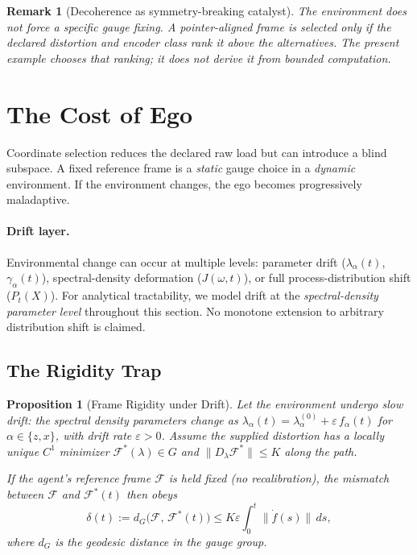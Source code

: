 \documentclass[12pt,a4paper,openany]{book}
\newtheorem{proposition}[theorem]{Proposition}
\newtheorem{remark}[theorem]{Remark}
\begin{document}
\begin{remark}[Decoherence as symmetry-breaking catalyst]
\label{T-II-rem:decoherence}
The environment does not \emph{force} a specific gauge fixing.  A
pointer-aligned frame is selected only if the declared distortion and
encoder class rank it above the alternatives.  The present example
chooses that ranking; it does not derive it from bounded computation.
\end{remark}

\section{The Cost of Ego}
\label{T-II-sec:cost}

Coordinate selection reduces the declared raw load but can introduce a
blind subspace. A fixed reference frame is a \emph{static}
gauge choice in a \emph{dynamic} environment.
If the environment changes, the ego becomes progressively
maladaptive.

\paragraph{Drift layer.}
Environmental change can occur at multiple levels:
parameter drift ($\lambda_\alpha(t)$, $\gamma_\alpha(t)$),
spectral-density deformation ($J(\omega, t)$), or
full process-distribution shift ($P_t(X)$).
For analytical tractability, we model drift at the
\emph{spectral-density parameter level} throughout this
section.  No monotone extension to arbitrary distribution shift is
claimed.

\subsection{The Rigidity Trap}
\label{T-II-subsec:rigidity}

\begin{proposition}[Frame Rigidity under Drift]
\label{T-II-prop:rigidity}
Let the environment undergo slow drift: the spectral density
parameters change as
$\lambda_\alpha(t) = \lambda_\alpha^{(0)}
+ \varepsilon\,f_\alpha(t)$
for $\alpha \in \{z, x\}$, with drift rate
$\varepsilon > 0$.
Assume the supplied distortion has a locally unique $C^1$
minimizer $\mathcal{F}^*(\lambda)\in G$ and
$\lVert D_\lambda\mathcal F^*\rVert\leq K$ along the path.

If the agent's reference frame $\mathcal{F}$ is held fixed
(no recalibration), the mismatch between $\mathcal{F}$
and $\mathcal{F}^*(t)$ then obeys
\begin{equation}
\label{T-II-eq:mismatch}
\delta(t)
:= d_G\bigl(\mathcal{F},\, \mathcal{F}^*(t)\bigr)
\leq K\varepsilon \int_0^t \lVert\dot{f}(s)\rVert\,ds,
\end{equation}
where $d_G$ is the geodesic distance in the gauge group.
\end{proposition}
\end{document}
